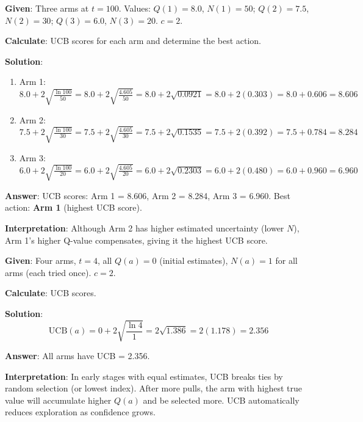\documentclass[11pt,a4paper]{article}
\begin{document}
\begin{tcolorbox}[colback=blue!5!white,colframe=blue!75!black,title=\textbf{Worked Example 7: UCB Score Calculation}]
\textbf{Given}: Three arms at $t = 100$. Values: $Q(1) = 8.0$, $N(1) = 50$; $Q(2) = 7.5$, $N(2) = 30$; $Q(3) = 6.0$, $N(3) = 20$. $c = 2$.

\textbf{Calculate}: UCB scores for each arm and determine the best action.

\textbf{Solution}:
\begin{enumerate}
    \item Arm 1: $8.0 + 2\sqrt{\frac{\ln 100}{50}} = 8.0 + 2\sqrt{\frac{4.605}{50}} = 8.0 + 2\sqrt{0.0921} = 8.0 + 2(0.303) = 8.0 + 0.606 = 8.606$
    \item Arm 2: $7.5 + 2\sqrt{\frac{\ln 100}{30}} = 7.5 + 2\sqrt{\frac{4.605}{30}} = 7.5 + 2\sqrt{0.1535} = 7.5 + 2(0.392) = 7.5 + 0.784 = 8.284$
    \item Arm 3: $6.0 + 2\sqrt{\frac{\ln 100}{20}} = 6.0 + 2\sqrt{\frac{4.605}{20}} = 6.0 + 2\sqrt{0.2303} = 6.0 + 2(0.480) = 6.0 + 0.960 = 6.960$
\end{enumerate}

\textbf{Answer}: UCB scores: Arm 1 = 8.606, Arm 2 = 8.284, Arm 3 = 6.960.
Best action: \textbf{Arm 1} (highest UCB score).

\textbf{Interpretation}: Although Arm 2 has higher estimated uncertainty (lower $N$), Arm 1's higher Q-value compensates, giving it the highest UCB score.
\end{tcolorbox}

\begin{tcolorbox}[colback=green!5!white,colframe=green!75!black,title=\textbf{Worked Example 8: UCB Early-Stage Behavior}]
\textbf{Given}: Four arms, $t = 4$, all $Q(a) = 0$ (initial estimates), $N(a) = 1$ for all arms (each tried once). $c = 2$.

\textbf{Calculate}: UCB scores.

\textbf{Solution}:
\[
\text{UCB}(a) = 0 + 2\sqrt{\frac{\ln 4}{1}} = 2\sqrt{1.386} = 2(1.178) = 2.356
\]

\textbf{Answer}: All arms have UCB = 2.356.

\textbf{Interpretation}: In early stages with equal estimates, UCB breaks ties by random selection (or lowest index). After more pulls, the arm with highest true value will accumulate higher $Q(a)$ and be selected more. UCB automatically reduces exploration as confidence grows.
\end{tcolorbox}
\end{document}
